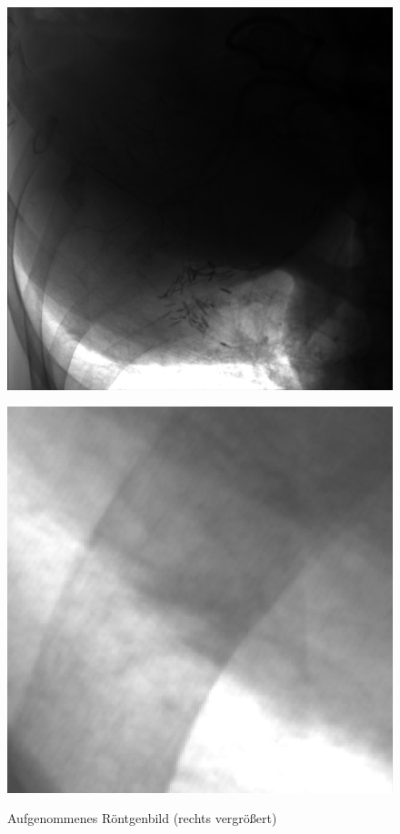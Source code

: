 \documentclass[a4paper,12pt]{article}
\theoremstyle{definition}
\theoremstyle{remark}
\begin{document}
\begin{figure}[H]
  \centering
  \begin{minipage}{0.49\textwidth}
    \centering
    \includegraphics[width=\linewidth]{Bilder/original.png}
    \label{fig:bild1}
  \end{minipage}
  \hfill
  \begin{minipage}{0.49\textwidth}
    \centering
    \includegraphics[width=\linewidth]{Bilder/original_zoomed.png}
    \label{fig:bild2}
  \end{minipage}
  \caption{Aufgenommenes Röntgenbild (rechts vergrößert)}
\end{figure}
\end{document}
